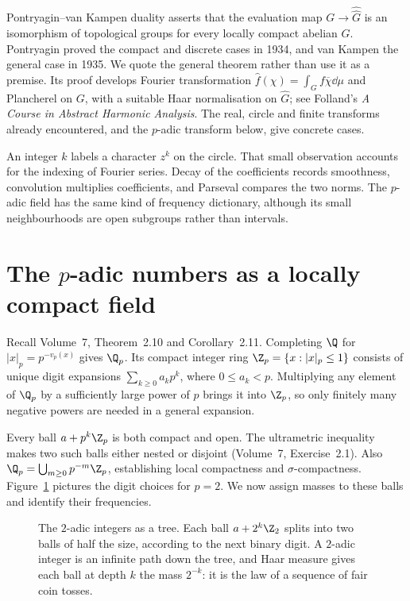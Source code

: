 \begin{remark}
Pontryagin--van Kampen duality asserts that the evaluation map $G\to\widehat{\widehat G}$ is an isomorphism of topological groups for every locally compact abelian $G$. Pontryagin proved the compact and discrete cases in 1934, and van Kampen the general case in 1935. We quote the general theorem rather than use it as a premise. Its proof develops Fourier transformation $\hat f(\chi)=\int_Gf\overline\chi\dd\mu$ and Plancherel on $G$, with a suitable Haar normalisation on $\widehat G$; see Folland's \emph{A Course in Abstract Harmonic Analysis}. The real, circle and finite transforms already encountered, and the $p$-adic transform below, give concrete cases.
\end{remark}

\begin{beauty}
An integer $k$ labels a character $z^k$ on the circle. That small observation accounts for the indexing of Fourier series. Decay of the coefficients records smoothness, convolution multiplies coefficients, and Parseval compares the two norms. The $p$-adic field has the same kind of frequency dictionary, although its small neighbourhoods are open subgroups rather than intervals.
\end{beauty}

\section{The \texorpdfstring{$p$}{p}-adic numbers as a locally compact field}\label{sec:padic}

Recall Volume~7, Theorem~2.10 and Corollary~2.11. Completing $\Q$ for $|x|_p=p^{-v_p(x)}$ gives $\Q_p$. Its compact integer ring $\Z_p=\{x:|x|_p\le1\}$ consists of unique digit expansions $\sum_{k\ge0}a_kp^k$, where $0\le a_k<p$. Multiplying any element of $\Q_p$ by a sufficiently large power of $p$ brings it into $\Z_p$, so only finitely many negative powers are needed in a general expansion.

Every ball $a+p^k\Z_p$ is both compact and open. The ultrametric inequality makes two such balls either nested or disjoint (Volume~7, Exercise~2.1). Also $\Q_p=\bigcup_{m\ge0}p^{-m}\Z_p$, establishing local compactness and $\sigma$-compactness. Figure~\ref{fig:zp} pictures the digit choices for $p=2$. We now assign masses to these balls and identify their frequencies.
\begin{figure}[ht]
\centering
{}
\caption{The $2$-adic integers as a tree. Each ball $a+2^k\Z_2$ splits into two balls of half the size, according to the next binary digit. A $2$-adic integer
is an infinite path down the tree, and Haar measure gives each ball at depth $k$ the mass $2^{-k}$: it is the law of a sequence of fair coin tosses.}
\label{fig:zp}
\end{figure}

